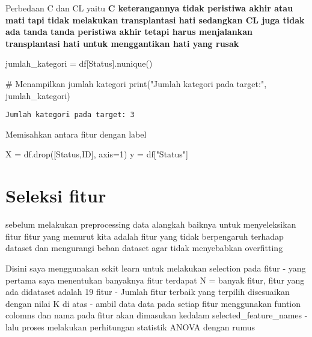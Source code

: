 \documentclass[
  letterpaper,
]{krantz}
\makeatletter
\newenvironment{Shaded}{\begin{snugshade}}{\end{snugshade}}
\newcommand{\BuiltInTok}[1]{\textcolor[rgb]{0.00,0.23,0.31}{#1}}
\newcommand{\CommentTok}[1]{\textcolor[rgb]{0.37,0.37,0.37}{#1}}
\newcommand{\DecValTok}[1]{\textcolor[rgb]{0.68,0.00,0.00}{#1}}
\newcommand{\NormalTok}[1]{\textcolor[rgb]{0.00,0.23,0.31}{#1}}
\newcommand{\OperatorTok}[1]{\textcolor[rgb]{0.37,0.37,0.37}{#1}}
\newcommand{\StringTok}[1]{\textcolor[rgb]{0.13,0.47,0.30}{#1}}
\newenvironment{kframe}{%
\medskip{}
\setlength{\fboxsep}{.8em}
 \def\at@end@of@kframe{}%
 \ifinner\ifhmode%
  \def\at@end@of@kframe{\end{minipage}}%
  \begin{minipage}{\columnwidth}%
 \fi\fi%
 \def\FrameCommand##1{\hskip\@totalleftmargin \hskip-\fboxsep
 \colorbox{shadecolor}{##1}\hskip-\fboxsep
     \hskip-\linewidth \hskip-\@totalleftmargin \hskip\columnwidth}%
 \MakeFramed {\advance\hsize-\width
   \@totalleftmargin\z@ \linewidth\hsize
   \@setminipage}}%
 {\par\unskip\endMakeFramed%
 \at@end@of@kframe}
\renewenvironment{Shaded}{\begin{kframe}}{\end{kframe}}
\makeatother
\begin{document}
Perbedaan C dan CL yaitu \textbf{C keterangannya tidak peristiwa akhir
atau mati tapi tidak melakukan transplantasi hati sedangkan CL juga
tidak ada tanda tanda peristiwa akhir tetapi harus menjalankan
transplantasi hati untuk menggantikan hati yang rusak}

\begin{Shaded}
\begin{Highlighting}[]
\NormalTok{jumlah\_kategori }\OperatorTok{=}\NormalTok{ df[}\StringTok{\textquotesingle{}Status\textquotesingle{}}\NormalTok{].nunique()}

\CommentTok{\# Menampilkan jumlah kategori}
\BuiltInTok{print}\NormalTok{(}\StringTok{"Jumlah kategori pada target:"}\NormalTok{, jumlah\_kategori)}
\end{Highlighting}
\end{Shaded}

\begin{verbatim}
Jumlah kategori pada target: 3
\end{verbatim}

Memisahkan antara fitur dengan label

\begin{Shaded}
\begin{Highlighting}[]
\NormalTok{X }\OperatorTok{=}\NormalTok{ df.drop([}\StringTok{\textquotesingle{}Status\textquotesingle{}}\NormalTok{,}\StringTok{\textquotesingle{}ID\textquotesingle{}}\NormalTok{], axis}\OperatorTok{=}\DecValTok{1}\NormalTok{)}
\NormalTok{y }\OperatorTok{=}\NormalTok{ df[}\StringTok{"Status"}\NormalTok{]}
\end{Highlighting}
\end{Shaded}

\hypertarget{seleksi-fitur-1}{%
\section{Seleksi fitur}\label{seleksi-fitur-1}}

sebelum melakukan preprocessing data alangkah baiknya untuk
menyeleksikan fitur fitur yang menurut kita adalah fitur yang tidak
berpengaruh terhadap dataset dan mengurangi beban dataset agar tidak
menyebabkan overfitting

Disini saya menggunakan sckit learn untuk melakukan selection pada fitur
- yang pertama saya menentukan banyaknya fitur terdapat N = banyak
fitur, fitur yang ada didataset adalah 19 fitur - Jumlah fitur terbaik
yang terpilih disesuaikan dengan nilai K di atas - ambil data data pada
setiap fitur menggunakan funtion colomns dan nama pada fitur akan
dimasukan kedalam selected\_feature\_names - lalu proses melakukan
perhitungan statistik ANOVA dengan rumus
\end{document}
